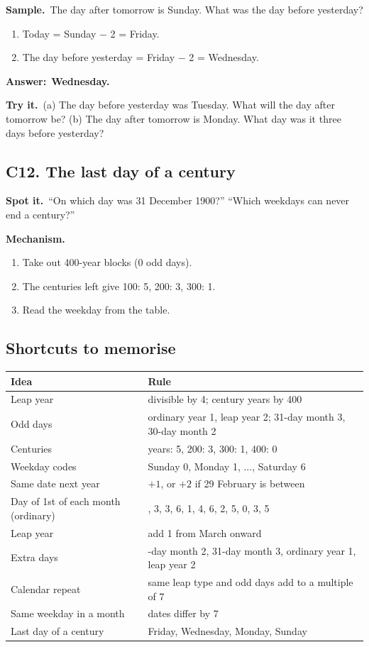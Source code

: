 \documentclass[11pt,a4paper]{article}
\let\oldsubsection\subsection
\renewcommand{\subsection}{\needspace{9\baselineskip}\oldsubsection}
\newcommand{\spot}{\textbf{\color{ember}Spot it.}\ }
\newcommand{\mech}{\textbf{\color{ember}Mechanism.}\ }
\newif\ifkeepsamp
\newcommand{\ans}[1]{\par\nopagebreak\noindent\textbf{\color{ember}Answer:}\ \textbf{#1}\par}
\newcommand{\samp}{\ifkeepsamp\needspace{4\baselineskip}\fi\textbf{\color{ember}Sample.}\ }
\newcommand{\tryit}[1]{\textbf{\color{ember}Try it.}\ #1}
\begin{document}
\samp The day after tomorrow is Sunday. What was the day before yesterday?
\begin{enumerate}
\item Today = Sunday $-$ 2 = Friday.
\item The day before yesterday = Friday $-$ 2 = Wednesday.
\end{enumerate}
\ans{Wednesday.}

\tryit (a) The day before yesterday was Tuesday. What will the day after tomorrow be? (b) The day after tomorrow is Monday. What day was it three days before yesterday?

\subsection{C12. The last day of a century}
\spot ``On which day was 31 December 1900?'' ``Which weekdays can never end a century?''

\mech
\begin{enumerate}
\item Take out 400-year blocks (0 odd days).
\item The centuries left give 100: 5, 200: 3, 300: 1.
\item Read the weekday from the table.
\end{enumerate}

\subsection*{Shortcuts to memorise}
\begin{center}\small\renewcommand{\arraystretch}{1.9}\setlength{\tabcolsep}{8pt}
\begin{tabularx}{\linewidth}{@{}>{\raggedright\arraybackslash}X>{\raggedright\arraybackslash}X@{}}
\toprule
\textbf{\color{slate}Idea} & \textbf{\color{slate}Rule} \\ \midrule
Leap year & divisible by 4; century years by 400 \\
Odd days & ordinary year 1, leap year 2; 31-day month 3, 30-day month 2 \\
Centuries & 100 years: 5, 200: 3, 300: 1, 400: 0 \\
Weekday codes & Sunday 0, Monday 1, ..., Saturday 6 \\
Same date next year & $+1$, or $+2$ if 29 February is between \\
Day of 1st of each month (ordinary) & 0, 3, 3, 6, 1, 4, 6, 2, 5, 0, 3, 5 \\
Leap year & add 1 from March onward \\
Extra days & 30-day month 2, 31-day month 3, ordinary year 1, leap year 2 \\
Calendar repeat & same leap type and odd days add to a multiple of 7 \\
Same weekday in a month & dates differ by 7 \\
Last day of a century & Friday, Wednesday, Monday, Sunday \\
\bottomrule
\end{tabularx}\end{center}
\end{document}
